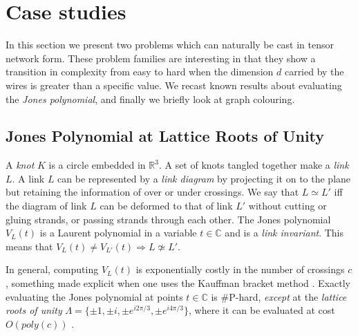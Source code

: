 \section{Case studies}

In this section we present two problems which can naturally be cast in tensor network form.
These problem families are interesting in that they show a transition in complexity from easy to hard when the dimension $d$ carried by the wires is greater than a specific value. We recast known results about evaluating the \emph{Jones polynomial}, and finally we briefly look at graph colouring.

\subsection{Jones Polynomial at Lattice Roots of Unity}


A \emph{knot} $K$ is a circle embedded in $\mathbb{R}^3$.
A set of knots tangled together make a \emph{link} $L$.
A link $L$ can be represented by a \emph{link diagram}
by projecting it on to the plane
but retaining the information of over or under crossings.
We say that $L\simeq L'$ iff the diagram of link $L$ can be deformed to that of link $L'$ without cutting or gluing strands, or passing strands through each other.
The Jones polynomial $V_L(t)$
is a Laurent polynomial in a variable $t\in\mathbb{C}$
and is a \emph{link invariant}.
This means that
$V_L(t)\neq V_{L'}(t)\Rightarrow L\not\simeq L'$.

In general, computing $V_L(t)$
is exponentially costly in the number of crossings $c$,
something made explicit when one uses the Kauffman bracket method \cite{Kauffman2001}.
Exactly evaluating the Jones polynomial at points $t\in\mathbb{C}$ is \#P-hard,
\emph{except} at the \emph{lattice roots of unity} $\Lambda = \{ \pm 1, \pm i, \pm e^{i 2\pi/3}, \pm e^{i 4\pi/3} \}$,
where it can be evaluated at cost $O(poly(c))$ \cite{jaeger_vertigan_welsh_1990}.



